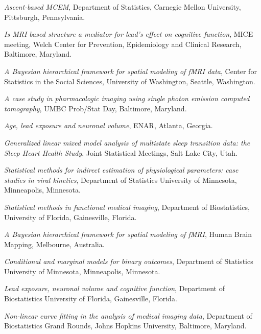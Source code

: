 \documentclass[12pt]{article}
\begin{document}
\begin{description}
    \begin{description}
        \item {\it Ascent-based MCEM}, Department of Statistics, Carnegie Mellon University, Pittsburgh, Pennsylvania.
        \item {\it Is MRI based structure a mediator for lead’s effect on cognitive function}, MICE meeting, Welch Center for Prevention, Epidemiology and Clinical Research, Baltimore, Maryland.
    \end{description}
    \item[\textnormal{2007}]
    \begin{description}
        \item {\it A Bayesian hierarchical framework for spatial modeling of fMRI data}, Center for Statistics in the Social Sciences, University of Washington, Seattle, Washington.
        \item {\it A case study in pharmacologic imaging using single photon emission computed tomography}, UMBC Prob/Stat Day, Baltimore, Maryland.
        \item {\it Age, lead exposure and neuronal volume}, ENAR, Atlanta, Georgia.
        \item {\it Generalized linear mixed model analysis of multistate sleep transition data: the Sleep Heart Health Study}, Joint Statistical Meetings, Salt Lake City, Utah.
        \item {\it Statistical methods for indirect estimation of physiological parameters: case studies in viral kinetics}, Department of Statistics University of Minnesota, Minneapolis, Minnesota.
        \item {\it Statistical methods in functional medical imaging}, Department of Biostatistics, University of Florida, Gainesville, Florida.
    \end{description}
    \item[\textnormal{2008}]
    \begin{description}
        \item {\it A Bayesian hierarchical framework for spatial modeling of fMRI}, Human Brain Mapping, Melbourne, Australia.
        \item {\it Conditional and marginal models for binary outcomes}, Department of Statistics University of Minnesota, Minneapolis, Minnesota.
        \item {\it Lead exposure, neuronal volume and cognitive function}, Department of Biostatistics University of Florida, Gainesville, Florida.
        \item {\it Non-linear curve fitting in the analysis of medical imaging data}, Department of Biostatistics Grand Rounds, Johns Hopkins University, Baltimore, Maryland.

\end{description}
\end{description}
\end{document}
